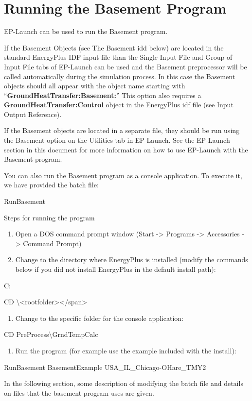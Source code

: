 \section{Running the Basement Program}\label{running-the-basement-program}

EP-Launch can be used to run the Basement program.

If the Basement Objects (see The Basement idd below) are located in the standard EnergyPlus IDF input file than the Single Input File and Group of Input File tabs of EP-Launch can be used and the Basement preprocessor will be called automatically during the simulation process. In this case the Basement objects should all appear with the object name starting with ``\textbf{GroundHeatTransfer:Basement:}'' This option also requires a \textbf{GroundHeatTransfer:Control} object in the EnergyPlus idf file (see Input Output Reference).

If the Basement objects are located in a separate file, they should be run using the Basement option on the Utilities tab in EP-Launch. See the EP-Launch section in this document for more information on how to use EP-Launch with the Basement program.

You can also run the Basement program as a console application. To execute it, we have provided the batch file:

RunBasement

Steps for running the program

\begin{enumerate}
\def\labelenumi{\arabic{enumi})}
\item
  Open a DOS command prompt window (Start -\textgreater{} Programs -\textgreater{} Accessories -\textgreater{} Command Prompt)
\item
  Change to the directory where EnergyPlus is installed (modify the commands below if you did not install EnergyPlus in the default install path):
\end{enumerate}

C:

CD \textbackslash{}\textless{}rootfolder\textgreater{}\textless{}/span\textgreater{}

\begin{enumerate}
\def\labelenumi{\arabic{enumi})}
\setcounter{enumi}{2}
\tightlist
\item
  Change to the specific folder for the console application:
\end{enumerate}

CD PreProcess\textbackslash{}GrndTempCalc

\begin{enumerate}
\def\labelenumi{\arabic{enumi})}
\setcounter{enumi}{3}
\tightlist
\item
  Run the program (for example use the example included with the install):
\end{enumerate}

RunBasement BasementExample USA\_IL\_Chicago-OHare\_TMY2

In the following section, some description of modifying the batch file and details on files that the basement program uses are given.
